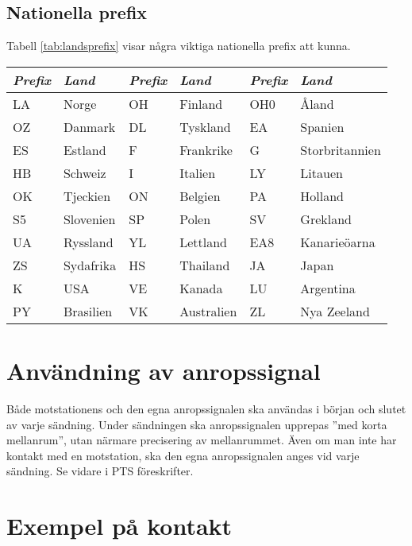 \subsection{Nationella prefix}

Tabell \ref{tab:landsprefix} visar några viktiga nationella prefix att kunna.

\begin{table*}[h]
  \begin{center}
    \begin{tabular}{llllll}
      \emph{Prefix} & \emph{Land} & \emph{Prefix} & \emph{Land} & \emph{Prefix} & \emph{Land} \\
      \hline
      LA & Norge & OH & Finland & OH0 & Åland\\
      OZ & Danmark & DL & Tyskland & EA & Spanien\\
      ES & Estland & F & Frankrike & G & Storbritannien\\
      HB & Schweiz & I & Italien & LY & Litauen\\
      OK & Tjeckien & ON & Belgien & PA & Holland\\
      S5 & Slovenien & SP & Polen & SV & Grekland\\
      UA & Ryssland & YL & Lettland & EA8 & Kanarieöarna\\
      ZS & Sydafrika & HS & Thailand & JA & Japan\\
      K & USA & VE & Kanada & LU & Argentina\\
      PY & Brasilien & VK & Australien & ZL & Nya Zeeland\\
    \end{tabular}
    \caption{Landsprefix}
    \label{tab:landsprefix}
  \end{center}
\end{table*}

\section{Användning av anropssignal}

Både motstationens och den egna anropssignalen ska användas i början
och slutet av varje sändning.
Under sändningen ska anropssignalen upprepas ''med korta mellanrum'', utan
närmare precisering av mellanrummet.
Även om man inte har kontakt med en motstation, ska den egna anropssignalen
anges vid varje sändning.
Se vidare i PTS föreskrifter.

\section{Exempel på kontakt}

